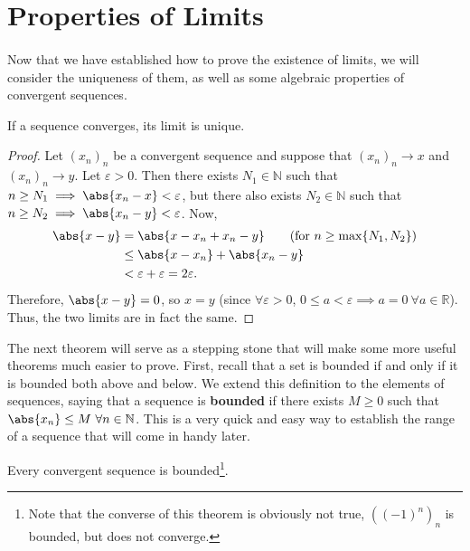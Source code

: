 \documentclass[../real_analysis.tex]{subfiles}
\begin{document}
    \section{Properties of Limits}
        \paragraph{}
        Now that we have established how to prove the existence of limits, we will consider the uniqueness of them, as well as some algebraic properties of convergent sequences.
        \begin{theorem}
            If a sequence converges, its limit is unique.
        \end{theorem}
        \begin{proof}
            Let $(x_n)_n$ be a convergent sequence and suppose that $(x_n)_n\to x$ and $(x_n)_n\to y$. Let $\varepsilon>0$. Then there exists $N_1\in\mathbb{N}$ such that $n\geq N_1\implies\abs{x_n-x}<\varepsilon$, but there also exists $N_2\in\mathbb{N}$ such that $n\geq N_2\implies\abs{x_n-y}<\varepsilon$.
            Now,
            \begin{align*}
                \abs{x-y} &= \abs{x-x_n+x_n-y}\tag{for $n\geq\max\{N_1, N_2\}$}\\
                &\leq\abs{x-x_n}+\abs{x_n-y}\\
                &<\varepsilon+\varepsilon=2\varepsilon.
            \end{align*}
            Therefore, $\abs{x-y}=0$, so $x=y$ (since $\forall\varepsilon>0$, $0\leq a<\varepsilon\implies a=0\ \forall a\in\mathbb{R}$). Thus, the two limits are in fact the same.
        \end{proof}
        The next theorem will serve as a stepping stone that will make some more useful theorems much easier to prove. First, recall that a set is bounded if and only if it is bounded both above and below. We extend this definition to the elements of sequences, saying that a sequence is \textbf{bounded} if there exists $M\geq0$ such that $\abs{x_n}\leq M\ \forall n\in\mathbb{N}$. This is a very quick and easy way to establish the range of a sequence that will come in handy later.
        \begin{theorem}\label{cvg-seq-bounded}
            Every convergent sequence is bounded\footnote{Note that the converse of this theorem is obviously not true, $((-1)^n)_n$ is bounded, but does not converge.}.
        \end{theorem}
\end{document}
